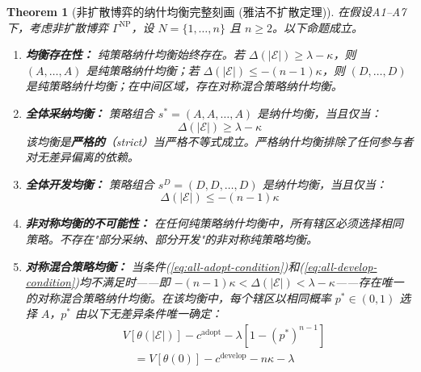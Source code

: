\documentclass[12pt,a4paper]{ctexart}
\newtheorem{theorem}{Theorem}[section]
\theoremstyle{definition}
\theoremstyle{remark}
\begin{document}
\begin{theorem}[非扩散博弈的纳什均衡完整刻画 (雅洁不扩散定理)]
\label{thm:npe-complete}
在假设A1--A7下，考虑非扩散博弈 $\Gamma^{\text{NP}}$，设 $N = \{1, \ldots, n\}$ 且 $n \geq 2$。以下命题成立。

\begin{enumerate}[label=(\roman*), itemsep=6pt]
\item \textbf{均衡存在性：} 纯策略纳什均衡始终存在。若 $\Delta(|\mathcal{E}|) \geq \lambda - \kappa$，则 $(A, \ldots, A)$ 是纯策略纳什均衡；若 $\Delta(|\mathcal{E}|) \leq -(n-1)\kappa$，则 $(D, \ldots, D)$ 是纯策略纳什均衡；在中间区域，存在对称混合策略纳什均衡。\label{item:existence}

\item \textbf{全体采纳均衡：} 策略组合 $s^* = (A, A, \ldots, A)$ 是纳什均衡，当且仅当：
\begin{equation}
\boxed{\Delta(|\mathcal{E}|) \geq \lambda - \kappa}
\label{eq:all-adopt-condition}
\end{equation}
该均衡是\textbf{严格的}（strict）当严格不等式成立。严格纳什均衡排除了任何参与者对无差异偏离的依赖。\label{item:all-adopt}

\item \textbf{全体开发均衡：} 策略组合 $s^{D} = (D, D, \ldots, D)$ 是纳什均衡，当且仅当：
\begin{equation}
\boxed{\Delta(|\mathcal{E}|) \leq -(n-1)\kappa}
\label{eq:all-develop-condition}
\end{equation}
\label{item:all-develop}

\item \textbf{非对称均衡的不可能性：} 在任何纯策略纳什均衡中，所有辖区必须选择相同策略。不存在"部分采纳、部分开发"的非对称纯策略均衡。\label{item:no-asym}

\item \textbf{对称混合策略均衡：} 当条件(\ref{eq:all-adopt-condition})和(\ref{eq:all-develop-condition})均不满足时——即 $-(n-1)\kappa < \Delta(|\mathcal{E}|) < \lambda - \kappa$——存在唯一的对称混合策略纳什均衡。在该均衡中，每个辖区以相同概率 $p^* \in (0,1)$ 选择 $A$，$p^*$ 由以下无差异条件唯一确定：
\begin{align}
&V[\theta(|\mathcal{E}|)] - c^{\text{adopt}} - \lambda\left[1 - (p^*)^{n-1}\right] \nonumber\\
&\quad = V[\theta(0)] - c^{\text{develop}} - n\kappa - \lambda
\label{eq:indifference}
\end{align}
\end{enumerate}
\end{theorem}
\end{document}
